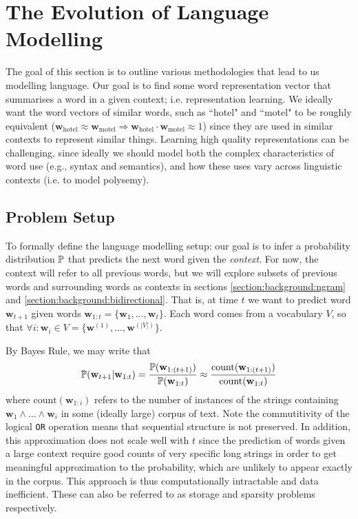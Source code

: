 \section{The Evolution of Language Modelling}
The goal of this section is to outline various methodologies that lead to us modelling language. Our goal is to find some word representation vector that summarises a word in a given context; i.e. representation learning. We ideally want the word vectors of similar words, such as ``hotel" and ``motel" to be roughly equivalent ($\mathbf{w}_\text{hotel} \approx \mathbf{w}_\text{motel} \Rightarrow \mathbf{w}_\text{hotel} \cdot \mathbf{w}_\text{motel} \approx 1$) since they are used in similar contexts to represent similar things. Learning high quality representations can be challenging, since ideally we should model both the complex characteristics of word use (e.g., syntax and semantics), and how these uses vary across linguistic contexts (i.e. to model polysemy).
\subsection{Problem Setup} \label{section:background:problemsetup}
To formally define the language modelling setup: our goal is to infer a probability distribution $\P$ that predicts the next word given the \textit{context}. For now, the context will refer to all previous words, but we will explore subsets of previous words and surrounding words as contexts in sections \ref{section:background:ngram} and \ref{section:background:bidirectional}. That is, at time $t$ we want to predict word $\mathbf{w}_{t+1}$ given words $\mathbf{w}_{1:t} = \{ \mathbf{w}_1, \dots, \mathbf{w}_t \}$. Each word comes from a vocabulary $V$, so that $\forall i: \mathbf{w}_i \in V = \{\mathbf{w}^{(1)}, \dots, \mathbf{w}^{(|V|)}\} $.

By Bayes Rule, we may write that
\begin{align}
\P(\mathbf{w}_{t+1} | \mathbf{w}_{1:t}) = \frac{\P(\mathbf{w}_{1:(t+1)})}{\P(\mathbf{w}_{1:t})} \approx \frac{\text{count}(\mathbf{w}_{1:(t+1)})}{\text{count}(\mathbf{w}_{1:t})}
\end{align} 
where $\text{count}(\mathbf{w}_{1:i})$ refers to the number of instances of the strings containing $\mathbf{w}_1 \land \dots \land \mathbf{w}_i$ in some (ideally large) corpus of text. Note the commutitivity of the logical \texttt{OR} operation means that sequential structure is not preserved. In addition, this approximation does not scale well with $t$ since the prediction of words given a large context require good counts of very specific long strings in order to get meaningful approximation to the probability, which are unlikely to appear exactly in the corpus. This approach is thus computationally intractable and data inefficient. These can also be referred to as storage and sparsity problems respectively.

